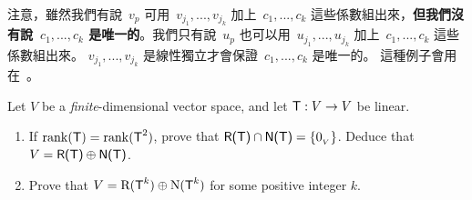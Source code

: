 \begin{note}
注意，雖然我們有說\ \(v_p\) 可用\ \(v_{j_1}, ..., v_{j_k}\) 加上\ \(c_1, ..., c_k\) 這些係數組出來，\textbf{但我們沒有說\ \(c_1, ..., c_k\) 是唯一的}。我們只有說\ \(u_p\) 也可以用\ \(u_{j_1}, ..., u_{j_k}\) 加上\ \(c_1, ..., c_k\) 這些係數組出來。
\(v_{j_1}, ..., v_{j_k}\) 是線性獨立才會保證\ \(c_1, ..., c_k\) 是唯一的。
這種例子會用在\ 。
\end{note}

\begin{exercise} \label{exercise 2.3.16}
Let \(V\) be a \emph{finite}-dimensional vector space, and let \(\textsf{T} : V \to V\) be linear.
\begin{enumerate}
\item If \(\mathrm{rank}(\textsf{T}) = \mathrm{rank}(\textsf{T}^2)\), prove that \(\textsf{R(T)} \cap \textsf{N(T)} = \{ 0_{_V} \}\).
    Deduce that \(V = \textsf{R(T)} \oplus \textsf{N(T)}\).
\item Prove that \(V = \mathrm{R}(\textsf{T}^k) \oplus \mathrm{N}(\textsf{T}^k)\) for some positive integer \(k\).
\end{enumerate}
\end{exercise}


